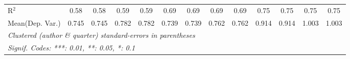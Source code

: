\begin{tabular}{lcccccccccccc}
   R$^2$                                    & 0.58         & 0.58          & 0.59         & 0.59          & 0.69    & 0.69         & 0.69    & 0.69          & 0.75    & 0.75         & 0.75    & 0.75\\  
Mean(Dep. Var.) & 0.745 & 0.745 & 0.782 & 0.782 & 0.739 & 0.739 & 0.762 & 0.762 & 0.914 & 0.914 & 1.003 & 1.003 \\
   \midrule \midrule
   \multicolumn{13}{l}{\emph{Clustered (author \& quarter) standard-errors in parentheses}}\\
   \multicolumn{13}{l}{\emph{Signif. Codes: ***: 0.01, **: 0.05, *: 0.1}}\\
\end{tabular}
\par\endgroup
